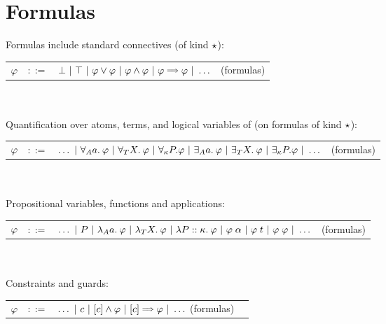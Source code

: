 \documentclass[english, mgr]{iithesis}
\begin{document}
\section{Formulas}
Formulas include standard connectives (of kind $\star$):

\begin{tabular}{rrlr}
$\varphi$ & $::=$ & $\bot
               \bnfor \top
               \bnfor \formphi \vee \formphi
               \bnfor \formphi \wedge \formphi
               \bnfor \formphi \fImp \formphi
               \bnfor \ldots $ & (formulas)
\end{tabular}
\\ \\
Quantification over atoms, terms, and logical variables of (on formulas of kind $\star$):
\newcommand\fForallForm[2]{\forall_{#2} #1 .}
\newcommand\fExistsForm[2]{\exists_{#2} #1 .}

\begin{tabular}{rrlr}
$\varphi$ & $::=$ & $\ldots
               \bnfor \fForallAtom{\atomv} \formphi
               \bnfor \fForallTerm{\termv} \formphi
               \bnfor \fForallForm{\propv}{\kind} \formphi
               \bnfor \fExistsAtom{\atomv} \formphi
               \bnfor \fExistsTerm{\termv} \formphi
               \bnfor \fExistsForm{\propv}{\kind} \formphi
               \bnfor \ldots$
    & (formulas)
\end{tabular}
\\ \\
Propositional variables, functions and applications:

\begin{tabular}{rrlr}
$\varphi$ & $::=$ & $\ldots
               \ |\  P
               \ |\  \lambda_A a .\: \varphi
               \ |\  \lambda_T X .\: \varphi
               \ |\  \lambda P :: \kappa.\: \varphi
               \ |\  \varphi \;\alpha
               \ |\  \varphi \;t
               \ |\  \varphi \; \varphi
               \ |\  \ldots$
    & (formulas)
\end{tabular}
\\ \\
Constraints and guards:

\begin{tabular}{rrlr}
$\varphi$ & $::=$ & $\ldots
               \bnfor \fConstr{\constr}
               \bnfor \fCAnd{\constr} \formphi
               \bnfor \fCImp{\constr} \formphi
               \bnfor \ldots$  (formulas)
\end{tabular}
\end{document}
